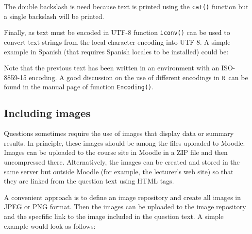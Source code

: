 \documentclass[a4paper]{article}
\newcommand{\RR}{\texttt{R}\ }
\newcommand{\code}[1]{\texttt{#1}}
\begin{document}
\begin{Schunk}
\end{Schunk}
\noindent
The double backslash is need because text is printed using the \code{cat()}
function but a single backslash will be printed.


Finally, as text must be encoded in UTF-8 function \code{iconv()} can be used
to convert  text strings from the local character encoding into UTF-8.
A simple example in Spanish (that requires Spanish locales to be installed) could be:


\noindent
Note that the previous text has been written in an environment with an
ISO-8859-15 encoding. A good discussion on the use of different encodings
in \RR can be found in the manual page of function \code{Encoding()}.



\subsection{Including images}

Questions sometimes require the use of images that display data or summary
results. In principle, these images should be among the files uploaded to
Moodle.  Images can be uploaded to the course site in Moodle in a ZIP file and
then uncompressed there.  Alternatively, the images can be created and stored
in the same server but outside Moodle (for example, the lecturer's web site) so
that they are linked from the question text using HTML tags.

A convenient approach is to define an image repository and create all images in
JPEG or PNG format. Then the images can be uploaded to the image repository and
the specfific link to the image included in the question text. A simple example
would look as follows:
\end{document}

